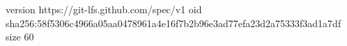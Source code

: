 version https://git-lfs.github.com/spec/v1
oid sha256:58f5306c4966a05aa0478961a4e16f7b2b96e3ad77efa23d2a75333f3ad1a7df
size 60
